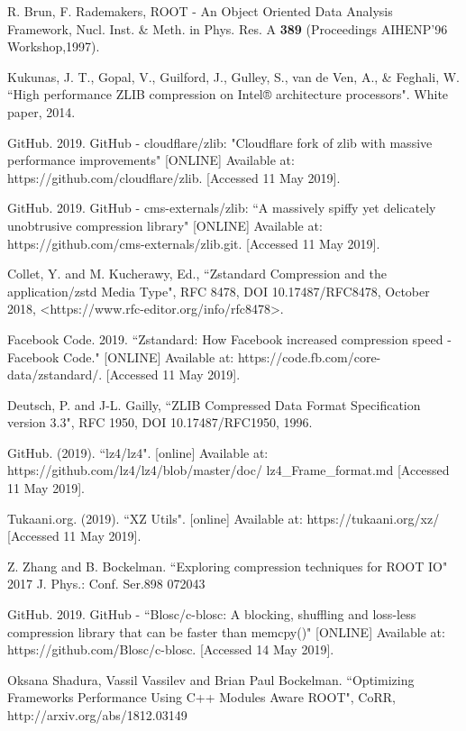 \documentclass[12pt]{iopart}
\begin{document}
\begin{thebibliography}{12}

R. Brun, F. Rademakers, ROOT - An Object Oriented Data Analysis Framework, Nucl. Inst. \& Meth. in Phys. Res. A  \textbf{389} (Proceedings AIHENP'96 Workshop,1997).

Kukunas, J. T., Gopal, V., Guilford, J., Gulley, S., van de Ven, A., \& Feghali, W. ``High performance ZLIB compression on Intel® architecture processors". White paper, 2014.

GitHub. 2019. GitHub - cloudflare/zlib: "Cloudflare fork of zlib with massive performance improvements" [ONLINE] Available at: https://github.com/cloudflare/zlib. [Accessed 11 May 2019]. 

GitHub. 2019. GitHub - cms-externals/zlib: ``A massively spiffy yet delicately unobtrusive compression library" [ONLINE] Available at: https://github.com/cms-externals/zlib.git. [Accessed 11 May 2019]. 

Collet, Y. and M. Kucherawy, Ed., ``Zstandard Compression and the application/zstd Media Type", RFC 8478, DOI 10.17487/RFC8478, October 2018, <https://www.rfc-editor.org/info/rfc8478>.

Facebook Code. 2019. ``Zstandard: How Facebook increased compression speed - Facebook Code." [ONLINE] Available at: https://code.fb.com/core-data/zstandard/. [Accessed 11 May 2019]. 

Deutsch, P. and J-L. Gailly, ``ZLIB Compressed Data Format Specification version 3.3", RFC 1950, DOI 10.17487/RFC1950, 1996.

GitHub. (2019). ``lz4/lz4". [online] Available at: https://github.com/lz4/lz4/blob/master/doc/
lz4\_Frame\_format.md [Accessed 11 May 2019].

Tukaani.org. (2019). ``XZ Utils". [online] Available at: https://tukaani.org/xz/ [Accessed 11 May 2019].

Z. Zhang and B. Bockelman. ``Exploring compression techniques for ROOT IO" 2017 J. Phys.: Conf. Ser.898 072043

GitHub. 2019. GitHub - ``Blosc/c-blosc: A blocking, shuffling and loss-less compression library that can be faster than memcpy()" [ONLINE] Available at: https://github.com/Blosc/c-blosc. [Accessed 14 May 2019]. 

Oksana Shadura, Vassil Vassilev and Brian Paul Bockelman. ``Optimizing Frameworks Performance Using C++ Modules Aware ROOT", CoRR, http://arxiv.org/abs/1812.03149

\end{thebibliography}
\end{document}
